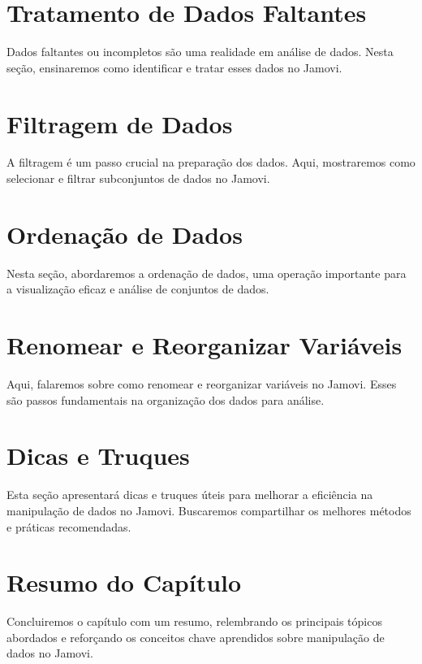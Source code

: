 \section{Tratamento de Dados Faltantes}
Dados faltantes ou incompletos são uma realidade em análise de dados. Nesta seção, ensinaremos como identificar e tratar esses dados no Jamovi.

\section{Filtragem de Dados}
A filtragem é um passo crucial na preparação dos dados. Aqui, mostraremos como selecionar e filtrar subconjuntos de dados no Jamovi.

\section{Ordenação de Dados}
Nesta seção, abordaremos a ordenação de dados, uma operação importante para a visualização eficaz e análise de conjuntos de dados.

\section{Renomear e Reorganizar Variáveis}
Aqui, falaremos sobre como renomear e reorganizar variáveis no Jamovi. Esses são passos fundamentais na organização dos dados para análise.

\section{Dicas e Truques}
Esta seção apresentará dicas e truques úteis para melhorar a eficiência na manipulação de dados no Jamovi. Buscaremos compartilhar os melhores métodos e práticas recomendadas.

\section{Resumo do Capítulo}
Concluiremos o capítulo com um resumo, relembrando os principais tópicos abordados e reforçando os conceitos chave aprendidos sobre manipulação de dados no Jamovi.
